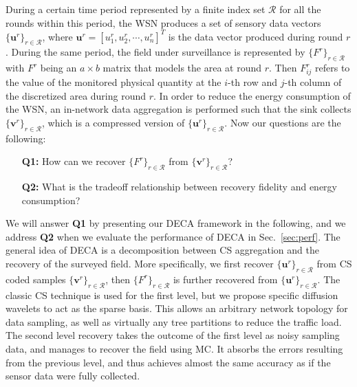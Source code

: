 \documentclass[conference]{IEEEtran}
\begin{document}
    During a certain time period represented by a finite index set $\mathcal{R}$ for all the rounds within this period, the WSN produces a set of sensory data vectors $\{\mathbf{u}^r\}_{r \in \mathcal{R}}$, where $\mathbf{u}^r = [u^r_1, u^r_2, \cdots, u^r_n]^T$ is the data vector produced during round $r$. During the same period, the field under surveillance is represented by $\{F^r\}_{r \in \mathcal{R}}$ with $F^r$ being an $a \times b$ matrix that models the area at round $r$. Then $F^r_{ij}$ refers to the value of the monitored physical quantity at the $i$-th row and $j$-th column of the discretized area during round $r$. In order to reduce the energy consumption of the WSN, an in-network data aggregation is performed such that the sink collects $\{\mathbf{v}^r\}_{r \in \mathcal{R}}$, which is a compressed version of $\{\mathbf{u}^r\}_{r \in \mathcal{R}}$. Now our questions are the following:
    \begin{itemize}
\item[\textbf{Q1:}] How can we recover $\{F^r\}_{r \in \mathcal{R}}$ from $\{\mathbf{v}^r\}_{r \in \mathcal{R}}$?
\item[\textbf{Q2:}] What is the tradeoff relationship between recovery fidelity and energy consumption?
\end{itemize}

    We will answer \textbf{Q1} by presenting our DECA framework in the following, and we address \textbf{Q2} when we evaluate the performance of DECA in Sec.~\ref{sec:perf}. The general idea of DECA is a decomposition between CS aggregation and the recovery of the surveyed field. More specifically, we first recover $\{\mathbf{u}^r\}_{r \in \mathcal{R}}$ from CS coded samples $\{\mathbf{v}^r\}_{r \in \mathcal{R}}$, then $\{F^r\}_{r \in \mathcal{R}}$ is further recovered from $\{\mathbf{u}^r\}_{r \in \mathcal{R}}$. The classic CS technique is used for the first level, but we propose specific diffusion wavelets to act as the sparse basis. This allows an arbitrary network topology for data sampling, as well as virtually any tree partitions to reduce the traffic load. The second level recovery takes the outcome of the first level as noisy sampling data, and manages to recover the field using MC. It absorbs the errors resulting from the previous level, and thus achieves almost the same accuracy as if the sensor data were fully collected.
\end{document}

